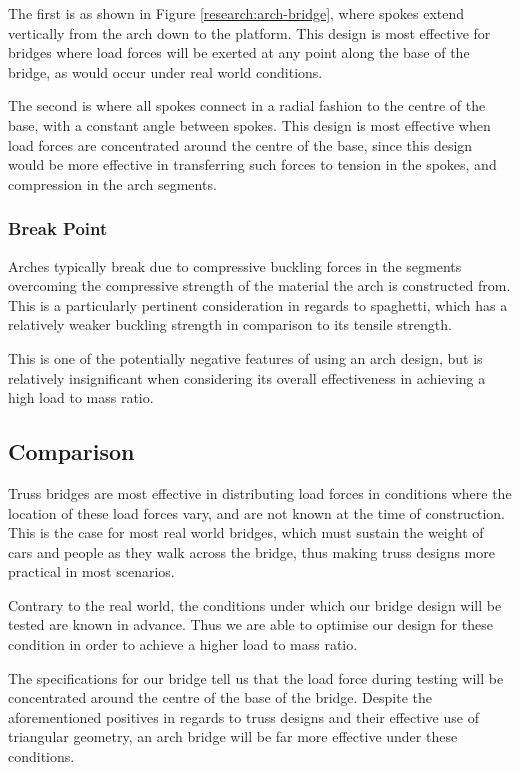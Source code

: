 \documentclass[a4paper,11pt]{article}
\begin{document}
The first is as shown in Figure \ref{research:arch-bridge}, where spokes extend
vertically from the arch down to the platform.
This design is most effective for bridges where load forces will be exerted
at any point along the base of the bridge, as would occur under real world
conditions.

The second is where all spokes connect in a radial fashion to the centre of the
base, with a constant angle between spokes.
This design is most effective when load forces are concentrated around the
centre of the base, since this design would be more effective in transferring
such forces to tension in the spokes, and compression in the arch segments.


\subsubsection{Break Point}

Arches typically break due to compressive buckling forces in the segments
overcoming the compressive strength of the material the arch is constructed
from.
This is a particularly pertinent consideration in regards to spaghetti, which
has a relatively weaker buckling strength in comparison to its tensile strength.

This is one of the potentially negative features of using an arch design, but
is relatively insignificant when considering its overall effectiveness in
achieving a high load to mass ratio.


\subsection{Comparison}

Truss bridges are most effective in distributing load forces in conditions where
the location of these load forces vary, and are not known at the time of
construction.
This is the case for most real world bridges, which must sustain the weight of
cars and people as they walk across the bridge, thus making truss designs more
practical in most scenarios.

Contrary to the real world, the conditions under which our bridge design will be
tested are known in advance.
Thus we are able to optimise our design for these condition in order to achieve
a higher load to mass ratio.

The specifications for our bridge tell us that the load force during testing will
be concentrated around the centre of the base of the bridge.
Despite the aforementioned positives in regards to truss designs and their
effective use of triangular geometry, an arch bridge will be far more
effective under these conditions.
\end{document}
